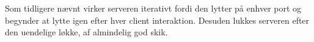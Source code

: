 \noindent Som tidligere nævnt virker serveren iterativt fordi den lytter på enhver port og begynder at lytte igen efter hver client interaktion. Desuden lukkes serveren efter den uendelige løkke, af almindelig god skik.


%
%
%
%
%
%
%
%
%
%
